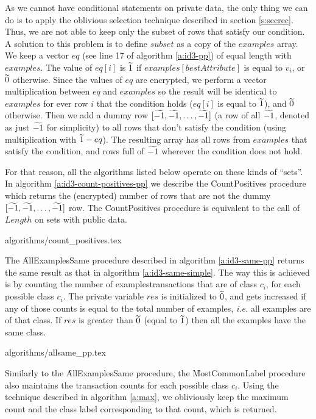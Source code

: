 As we cannot have conditional statements on private data, the only thing we can do is to apply the oblivious selection technique described in section \ref{s:secrec}.
Thus, we are not able to keep only the subset of rows that satisfy our condition.
A solution to this problem is to define $subset$ as a copy of the $examples$ array.
We keep a vector $eq$ (see line 17 of algorithm \ref{a:id3-pp}) of equal length with $examples$.
The value of $eq[i]$ is $\widetilde{1}$ if $examples[bestAttribute]$ is equal to $v_i$, or $\widetilde{0}$ otherwise.
Since the values of $eq$ are encrypted, we perform a vector multiplication between $eq$ and $examples$ so the result will be identical to $examples$ for ever row $i$ that the condition holds ($eq[i]$ is equal to $\widetilde{1}$), and $\widetilde{0}$ otherwise.
Then we add a dummy row $[\widetilde{-1}, \widetilde{-1}, \dots, \widetilde{-1}]$ (a row of all $\widetilde{-1}$, denoted as just $\widetilde{-1}$ for simplicity) to all rows that don't satisfy the condition (using multiplication with $\widetilde{1} - eq$).
The resulting array has all rows from $examples$ that satisfy the condition, and rows full of $\widetilde{-1}$ wherever the condition does not hold.

For that reason, all the algorithms listed below operate on these kinds of ``sets''.
In algorithm \ref{a:id3-count-positives-pp} we describe the \f{CountPositives} procedure which returns the (encrypted) number of rows that are not the dummy $[\widetilde{-1}, \widetilde{-1}, \dots, \widetilde{-1}]$ row.
The \f{CountPositives} procedure is equivalent to the call of $Length$ on sets with public data.


{algorithms/count_positives.tex}

The \f{AllExamplesSame} procedure described in algorithm \ref{a:id3-same-pp} returns the same result as that in algorithm \ref{a:id3-same-simple}.
The way this is achieved is by counting the number of examples\myslash transactions that are of class $c_i$, for each possible class $c_i$.
The private variable $res$ is initialized to $\widetilde{0}$, and gets increased if any of those counts is equal to the total number of examples, \textit{i.e.} all examples are of that class.
If $res$ is greater than $\widetilde{0}$ (equal to $\widetilde{1}$) then all the examples have the same class.

{algorithms/allsame_pp.tex}

Similarly to the \f{AllExamplesSame} procedure, the \f{MostCommonLabel} procedure also maintains the transaction counts for each possible class $c_i$.
Using the technique described in algorithm \ref{a:max}, we obliviously keep the maximum count and the class label corresponding to that count, which is returned.

